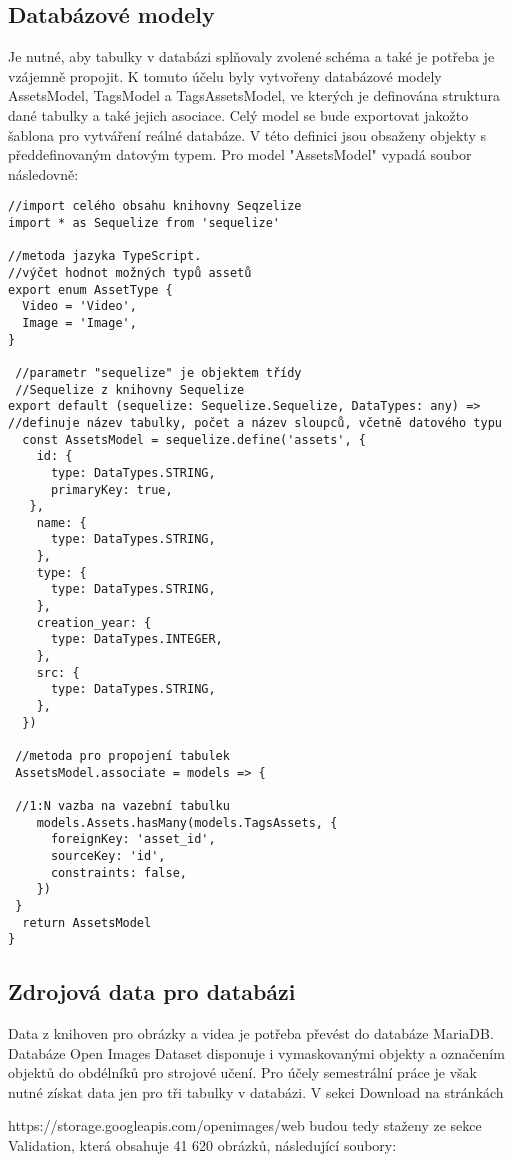 \subsection{Databázové modely}
Je nutné, aby tabulky v databázi splňovaly zvolené schéma a také je potřeba je vzájemně propojit. K tomuto účelu byly vytvořeny databázové modely AssetsModel, TagsModel a TagsAssetsModel, ve kterých je definována struktura dané tabulky a také jejich asociace. Celý model se bude exportovat jakožto šablona pro vytváření reálné databáze. V této definici jsou obsaženy objekty s předdefinovaným datovým typem. Pro model "AssetsModel" vypadá soubor následovně:
\begin{lstlisting}
//import celého obsahu knihovny Seqzelize
import * as Sequelize from 'sequelize'

//metoda jazyka TypeScript. 
//výčet hodnot možných typů assetů
export enum AssetType {
  Video = 'Video',
  Image = 'Image',
}

 //parametr "sequelize" je objektem třídy 
 //Sequelize z knihovny Sequelize
export default (sequelize: Sequelize.Sequelize, DataTypes: any) => 
//definuje název tabulky, počet a název sloupců, včetně datového typu
  const AssetsModel = sequelize.define('assets', { 
    id: {
      type: DataTypes.STRING,
      primaryKey: true,
   },
    name: {
      type: DataTypes.STRING,
    },
    type: {
      type: DataTypes.STRING,
    },
    creation_year: {
      type: DataTypes.INTEGER,
    },
    src: {
      type: DataTypes.STRING,
    },
  })

 //metoda pro propojení tabulek
 AssetsModel.associate = models => {

 //1:N vazba na vazební tabulku
    models.Assets.hasMany(models.TagsAssets, {
      foreignKey: 'asset_id',
      sourceKey: 'id',
      constraints: false,
    })
 }
  return AssetsModel
}
\end{lstlisting}

\subsection{Zdrojová data pro databázi}
Data z knihoven pro obrázky a videa je potřeba převést do databáze MariaDB. Databáze Open Images Dataset disponuje i vymaskovanými objekty a označením objektů do obdélníků pro strojové učení. Pro účely semestrální práce je však nutné získat data jen pro tři tabulky v databázi. V sekci Download na stránkách

https://storage.googleapis.com/openimages/web budou tedy staženy ze sekce Validation, která obsahuje 41 620 obrázků, následující soubory:

